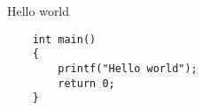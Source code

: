 \documentclass[handout]{beamer}
\begin{document}
\begin{frame}[fragile,t]{Hello world}
	\begin{verbatim}
	int main()
	{
	    printf("Hello world");
	    return 0;
	}
	\end{verbatim}
\end{frame}

\end{document}
